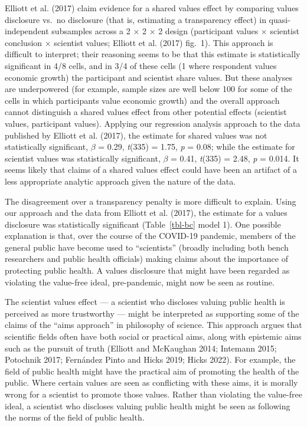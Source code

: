\documentclass[
  letterpaper,
  DIV=11,
  numbers=noendperiod]{scrartcl}
\begin{document}
Elliott et al. (2017) claim evidence for a shared values effect by
comparing values disclosure vs.~no disclosure (that is, estimating a
transparency effect) in quasi-independent subsamples across a 2
\(\times\) 2 \(\times\) 2 design (participant values \(\times\)
scientist conclusion \(\times\) scientist values; Elliott et al. (2017)
fig.~1). This approach is difficult to interpret; their reasoning seems
to be that this estimate is statistically significant in 4/8 cells, and
in 3/4 of these cells (1 where respondent values economic growth) the
participant and scientist share values. But these analyses are
underpowered (for example, sample sizes are well below 100 for some of
the cells in which participants value economic growth) and the overall
approach cannot distinguish a shared values effect from other potential
effects (scientist values, participant values). Applying our regression
analysis approach to the data published by Elliott et al. (2017), the
estimate for shared values was not statistically significant, \(\beta\)
= 0.29, \emph{t}(335) = 1.75, \emph{p} = 0.08; while the estimate for
scientist values was statistically significant, \(\beta\) = 0.41,
\emph{t}(335) = 2.48, \emph{p} = 0.014. It seems likely that claims of a
shared values effect could have been an artifact of a less appropriate
analytic approach given the nature of the data.

The disagreement over a transparency penalty is more difficult to
explain. Using our approach and the data from Elliott et al. (2017), the
estimate for a values disclosure was statistically significant
(Table~\ref{tbl-bc} model 1). One possible explanation is that, over the
course of the COVID-19 pandemic, members of the general public have
become used to ``scientists'' (broadly including both bench researchers
and public health officials) making claims about the importance of
protecting public health. A values disclosure that might have been
regarded as violating the value-free ideal, pre-pandemic, might now be
seen as routine.

The scientist values effect --- a scientist who discloses valuing public
health is perceived as more trustworthy --- might be interpreted as
supporting some of the claims of the ``aims approach'' in philosophy of
science. This approach argues that scientific fields often have both
social or practical aims, along with epistemic aims such as the pursuit
of truth (Elliott and McKaughan 2014; Intemann 2015; Potochnik 2017;
Fernández Pinto and Hicks 2019; Hicks 2022). For example, the field of
public health might have the practical aim of promoting the health of
the public. Where certain values are seen as conflicting with these
aims, it is morally wrong for a scientist to promote those values.
Rather than violating the value-free ideal, a scientist who discloses
valuing public health might be seen as following the norms of the field
of public health.
\end{document}
